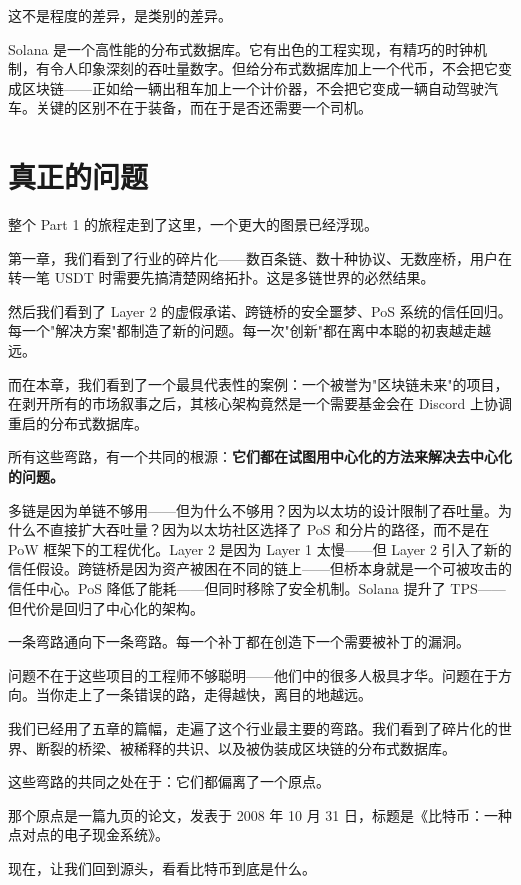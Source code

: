 \documentclass[a4paper,12pt,openany]{ctexbook}
\begin{document}
这不是程度的差异，是类别的差异。

Solana 是一个高性能的分布式数据库。它有出色的工程实现，有精巧的时钟机制，有令人印象深刻的吞吐量数字。但给分布式数据库加上一个代币，不会把它变成区块链——正如给一辆出租车加上一个计价器，不会把它变成一辆自动驾驶汽车。关键的区别不在于装备，而在于是否还需要一个司机。


\section*{真正的问题}


整个 Part 1 的旅程走到了这里，一个更大的图景已经浮现。

第一章，我们看到了行业的碎片化——数百条链、数十种协议、无数座桥，用户在转一笔 USDT 时需要先搞清楚网络拓扑。这是多链世界的必然结果。

然后我们看到了 Layer 2 的虚假承诺、跨链桥的安全噩梦、PoS 系统的信任回归。每一个"解决方案"都制造了新的问题。每一次"创新"都在离中本聪的初衷越走越远。

而在本章，我们看到了一个最具代表性的案例：一个被誉为"区块链未来"的项目，在剥开所有的市场叙事之后，其核心架构竟然是一个需要基金会在 Discord 上协调重启的分布式数据库。

所有这些弯路，有一个共同的根源：\textbf{它们都在试图用中心化的方法来解决去中心化的问题。}

多链是因为单链不够用——但为什么不够用？因为以太坊的设计限制了吞吐量。为什么不直接扩大吞吐量？因为以太坊社区选择了 PoS 和分片的路径，而不是在 PoW 框架下的工程优化。Layer 2 是因为 Layer 1 太慢——但 Layer 2 引入了新的信任假设。跨链桥是因为资产被困在不同的链上——但桥本身就是一个可被攻击的信任中心。PoS 降低了能耗——但同时移除了安全机制。Solana 提升了 TPS——但代价是回归了中心化的架构。

一条弯路通向下一条弯路。每一个补丁都在创造下一个需要被补丁的漏洞。

问题不在于这些项目的工程师不够聪明——他们中的很多人极具才华。问题在于方向。当你走上了一条错误的路，走得越快，离目的地越远。


我们已经用了五章的篇幅，走遍了这个行业最主要的弯路。我们看到了碎片化的世界、断裂的桥梁、被稀释的共识、以及被伪装成区块链的分布式数据库。

这些弯路的共同之处在于：它们都偏离了一个原点。

那个原点是一篇九页的论文，发表于 2008 年 10 月 31 日，标题是《比特币：一种点对点的电子现金系统》。

现在，让我们回到源头，看看比特币到底是什么。
\end{document}
